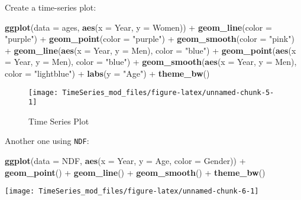 \documentclass[]{article}
\newenvironment{Shaded}{\begin{snugshade}}{\end{snugshade}}
\newcommand{\KeywordTok}[1]{\textcolor[rgb]{0.13,0.29,0.53}{\textbf{{#1}}}}
\newcommand{\DataTypeTok}[1]{\textcolor[rgb]{0.13,0.29,0.53}{{#1}}}
\newcommand{\StringTok}[1]{\textcolor[rgb]{0.31,0.60,0.02}{{#1}}}
\newcommand{\NormalTok}[1]{{#1}}
\begin{document}
Create a time-series plot:

\begin{Shaded}
\begin{Highlighting}[]
\KeywordTok{ggplot}\NormalTok{(}\DataTypeTok{data =} \NormalTok{ages, }\KeywordTok{aes}\NormalTok{(}\DataTypeTok{x =} \NormalTok{Year, }\DataTypeTok{y =} \NormalTok{Women)) +}\StringTok{ }
\StringTok{  }\KeywordTok{geom_line}\NormalTok{(}\DataTypeTok{color =} \StringTok{"purple"}\NormalTok{) +}\StringTok{ }
\StringTok{  }\KeywordTok{geom_point}\NormalTok{(}\DataTypeTok{color =} \StringTok{"purple"}\NormalTok{) +}\StringTok{ }
\StringTok{  }\KeywordTok{geom_smooth}\NormalTok{(}\DataTypeTok{color =} \StringTok{"pink"}\NormalTok{) +}\StringTok{ }
\StringTok{  }\KeywordTok{geom_line}\NormalTok{(}\KeywordTok{aes}\NormalTok{(}\DataTypeTok{x =} \NormalTok{Year, }\DataTypeTok{y =} \NormalTok{Men), }\DataTypeTok{color =} \StringTok{"blue"}\NormalTok{) +}\StringTok{ }
\StringTok{  }\KeywordTok{geom_point}\NormalTok{(}\KeywordTok{aes}\NormalTok{(}\DataTypeTok{x =} \NormalTok{Year, }\DataTypeTok{y =} \NormalTok{Men), }\DataTypeTok{color =} \StringTok{"blue"}\NormalTok{) +}\StringTok{ }
\StringTok{  }\KeywordTok{geom_smooth}\NormalTok{(}\KeywordTok{aes}\NormalTok{(}\DataTypeTok{x =} \NormalTok{Year, }\DataTypeTok{y =} \NormalTok{Men), }\DataTypeTok{color =} \StringTok{"lightblue"}\NormalTok{) +}
\StringTok{  }\KeywordTok{labs}\NormalTok{(}\DataTypeTok{y =} \StringTok{"Age"}\NormalTok{) +}
\StringTok{  }\KeywordTok{theme_bw}\NormalTok{()}
\end{Highlighting}
\end{Shaded}

\begin{figure}

{\centering \texttt{[image: TimeSeries\_mod\_files/figure-latex/unnamed-chunk-5-1]} 

}

\caption{Time Series Plot}\label{fig:unnamed-chunk-5}
\end{figure}

Another one using \texttt{NDF}:

\begin{Shaded}
\begin{Highlighting}[]
\KeywordTok{ggplot}\NormalTok{(}\DataTypeTok{data =} \NormalTok{NDF, }\KeywordTok{aes}\NormalTok{(}\DataTypeTok{x =} \NormalTok{Year, }\DataTypeTok{y =} \NormalTok{Age, }\DataTypeTok{color =} \NormalTok{Gender)) +}\StringTok{ }
\StringTok{  }\KeywordTok{geom_point}\NormalTok{() +}\StringTok{ }
\StringTok{  }\KeywordTok{geom_line}\NormalTok{() +}
\StringTok{  }\KeywordTok{geom_smooth}\NormalTok{() +}
\StringTok{  }\KeywordTok{theme_bw}\NormalTok{() }
\end{Highlighting}
\end{Shaded}

\begin{center}\texttt{[image: TimeSeries\_mod\_files/figure-latex/unnamed-chunk-6-1]} \end{center}
\end{document}
